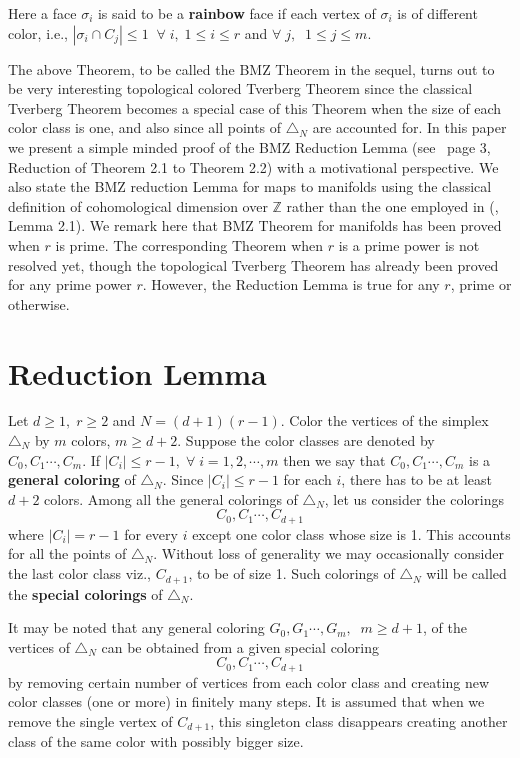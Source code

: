 \documentclass[11pt]{amsart}
\def\Z{\mathbb Z}
\def\t{\triangle}
\def\bn{\bigskip\noindent}
\begin{document}
Here  a face $\sigma_i$ is said to be a {\bf rainbow} face if each vertex of $\sigma_i$ is of different color, i.e., $|\sigma_i\cap C_j|\leq 1\;\;\forall\; i,\; 1\leq i\leq r$ and $\forall\; j,\;\;1\leq j\leq m$.

\bn The above Theorem, to be called the BMZ Theorem in the sequel, turns out to be very interesting topological colored Tverberg Theorem since the classical Tverberg Theorem becomes a special case  of this Theorem when the size of each color class is one, and also since all points of $\t_N$ are accounted for.
In this  paper we present  a simple minded proof of the BMZ Reduction Lemma (see~\cite{bmz} page 3, Reduction of Theorem 2.1 to Theorem 2.2) with a motivational perspective. We also state the BMZ reduction Lemma for maps to manifolds using the classical definition of cohomological dimension over $\Z$ rather than the one employed in (\cite{bmz3}, Lemma 2.1). We remark here that BMZ Theorem for manifolds has been proved when $r$ is prime.  The corresponding Theorem when $r$ is a prime power is not resolved yet, though the topological Tverberg Theorem has already been proved for any prime power $r$. However, the Reduction Lemma is true for any $r$, prime or otherwise.

\section{Reduction Lemma}
Let $d\geq 1,\;r\geq 2$ and $N=(d+1)(r-1)$. Color the vertices of the simplex $\t_N$ by $m$ colors, $m\geq d+2$. Suppose the color classes are denoted by $C_0,C_1\cdots ,C_m$.  If $|C_i|\leq r-1,\;\forall \; i=1,2,\cdots ,m$ then we say that
$C_0,C_1\cdots ,C_m$ is a {\bf general coloring} of $\t_N$.  Since $|C_i|\leq r-1$ for each $i$, there has to be at least $d+2$ colors.
 Among all the general colorings of $\t_N$, let us consider the colorings
$$C_0,C_1\cdots ,C_{d+1}$$ where $|C_i|= r-1$ for every $i$ except one color class whose size is 1. This accounts for all the points of $\t_N$. Without loss of generality we may occasionally consider the last color class viz.,
$C_{d+1}$, to be of size 1. Such colorings of $\t_N$ will be called the {\bf special colorings} of $\t_N.$

\bn {\bf Note :} It may be noted that any general coloring $G_0,G_1\cdots ,G_m,\;\;m\geq d+1$, of the vertices of $\t_N$ can be obtained from a given special coloring $$C_0,C_1\cdots ,C_{d+1}$$ by removing certain number of vertices from each color class and creating new color classes (one or more) in finitely many steps.
It is assumed that when we remove the single vertex of $C_{d+1}$, this singleton class disappears creating  another class of the same color with possibly bigger size.
\end{document}
